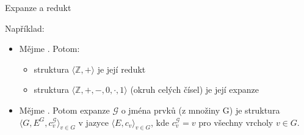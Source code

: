 \documentclass{beamer}
\begin{document}
\begin{frame}{Expanze a redukt}
 
    \pause

    
    \medskip
    Například:\pause
    \begin{itemize}
        \item Mějme . Potom: \pause
        \begin{itemize}
            \item struktura $\langle \mathbb Z,+\rangle$ je její redukt\pause
            \item struktura $\langle\mathbb Z,+,-,0,\cdot,1\rangle$ (\alert{okruh} celých čísel) je její expanze\pause
        \end{itemize}
    
        \item Mějme . Potom \alert{expanze $\mathcal G$ o jména prvků} (z množiny G) je struktura $\langle G, E^G,c_v^\mathcal G\rangle_{v\in G}$ v jazyce $\langle E,c_v\rangle_{v\in G}$, kde $c_v^\mathcal G=v$ pro všechny vrcholy $v\in G$.
    \end{itemize}

\end{frame}
\end{document}
